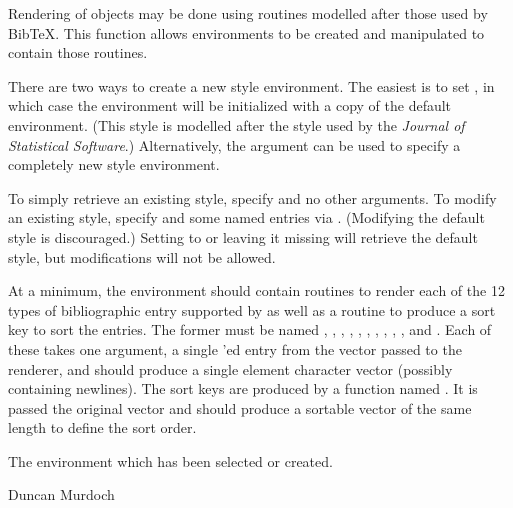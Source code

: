 \begin{Details}\relax
Rendering of  objects may be done using routines
modelled after those used by BibTeX.  This function allows environments
to be created and manipulated to contain those routines.

There are two ways to create a new style environment.  The easiest
is to set , in which case the environment will be
initialized with a copy of the default  environment.  (This style
is modelled after the  style used by the \emph{Journal 
of Statistical Software}.)  Alternatively, the  argument 
can be used to specify a completely new style environment.

To simply retrieve an existing style, specify 
and no other arguments.  To modify an existing style, specify 
and some named entries via .  (Modifying the default
 style is discouraged.)  Setting  to 
or leaving it missing will retrieve the default style, but modifications
will not be allowed.

At a minimum, the environment should contain routines to render each
of the 12 types of bibliographic entry supported by
 as well as a routine to produce a sort key to
sort the entries.  The former must be named ,
, , ,
, ,
, , ,
,  and
.  Each of these takes one argument, a single
'ed entry from the  vector
passed to the renderer, and should produce a single element character
vector (possibly containing newlines).  The sort keys are produced
by a function named .  It is passed the original 
 vector and should produce a sortable vector of 
the same length to define the sort order.
\end{Details}
%
\begin{Value}
The environment which has been selected or created.
\end{Value}
%
\begin{Author}\relax
Duncan Murdoch
\end{Author}
%
\begin{SeeAlso}\relax
{}
\end{SeeAlso}
